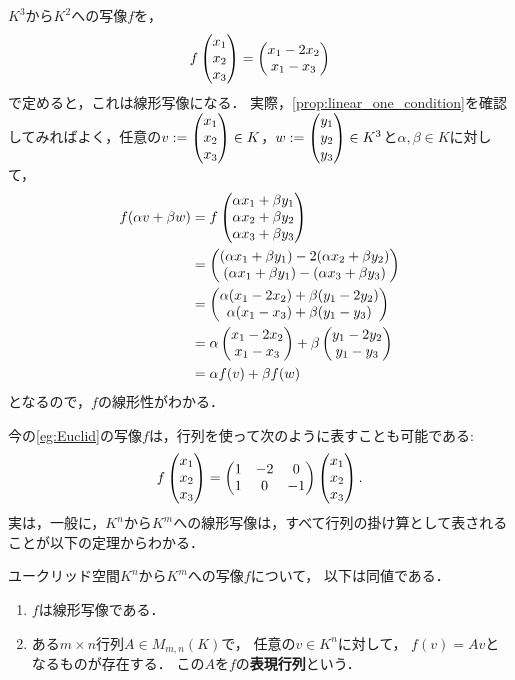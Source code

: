 \begin{example}\label{eg:Euclid}
    $K^3$から$K^2$への写像$f$を，
    \[
        f\begin{pmatrix} x_1 \\ x_2 \\ x_3 \end{pmatrix} = \begin{pmatrix} x_1 - 2x_2 \\ x_1 - x_3 \end{pmatrix}
    \]
    で定めると，これは線形写像になる．
    実際，\cref{prop:linear_one_condition}を確認してみればよく，任意の$v:=\begin{pmatrix} x_1 \\ x_2 \\ x_3 \end{pmatrix} \in K$，$w:=\begin{pmatrix} y_1 \\ y_2 \\ y_3 \end{pmatrix} \in K^3$と$\alpha,\beta \in K$に対して，
    \[
        \begin{aligned}
            f(\alpha v + \beta w) %
            &= f \pmt{\alpha x_1 + \beta y_1 \\ \alpha x_2 + \beta y_2 \\ \alpha x_3 + \beta y_3} \\
            &= \pmt{(\alpha x_1 + \beta y_1)-2(\alpha x_2 + \beta y_2) \\ (\alpha x_1 + \beta y_1) - (\alpha x_3 + \beta y_3)} \\
            &= \pmt{\alpha (x_1 - 2x_2) + \beta (y_1 - 2y_2) \\ \alpha (x_1 - x_3) + \beta (y_1 - y_3)} \\
            &= \alpha \pmt{x_1 - 2x_2 \\ x_1 - x_3} + \beta \pmt{y_1 - 2y_2 \\ y_1 - y_3} \\
            &= \alpha f(v) + \beta f(w)
        \end{aligned}
    \]
    となるので，$f$の線形性がわかる．
\end{example}
今の\cref{eg:Euclid}の写像$f$は，行列を使って次のように表すことも可能である:
\begin{equation}\label{eq:example_matrix}
    f\begin{pmatrix} x_1 \\ x_2 \\ x_3 \end{pmatrix} = \begin{pmatrix} 1 & -2 & 0 \\ 1 & 0 & -1 \end{pmatrix} \begin{pmatrix} x_1 \\ x_2 \\ x_3 \end{pmatrix}.
\end{equation}
実は，一般に，$K^n$から$K^m$への線形写像は，すべて行列の掛け算として表されることが以下の定理からわかる．
\begin{thm}\label{thm:Euclid_linear_map}
    ユークリッド空間$K^n$から$K^m$への写像$f$について，
    以下は同値である．
    \begin{enumerate}
        \item $f$は線形写像である．
        \item ある$m \times n$行列$A \in M_{m,n}(K)$で，
        任意の$v \in K^n$に対して，
        $f(v) = Av$となるものが存在する．
        この$A$を$f$の\textbf{表現行列}という．
    \end{enumerate}
\end{thm}
